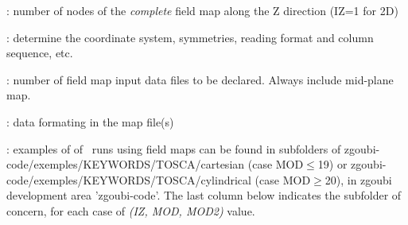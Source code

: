 
 : number of nodes of the \textsl{complete} field map along the Z direction (IZ=1 for 2D)

 : determine the coordinate system,  symmetries, reading format and column sequence,  etc.

 : number of field map input data files to be declared. Always include mid-plane map.

 : data formating in the map file(s) 

 : examples of of \zgoubi\ runs using field maps can be found in subfolders 
of zgoubi-code/exemples/KEYWORDS/TOSCA/cartesian (case MOD$\leq$19) or  zgoubi-code/exemples/KEYWORDS/TOSCA/cylindrical (case MOD$\geq$20), 
in zgoubi development area 'zgoubi-code'. The last column  below 
indicates the  subfolder of concern, for each case of \textsl{(IZ, MOD, MOD2)} value. 

~

\centering

\renewcommand{\arraystretch}{1}


